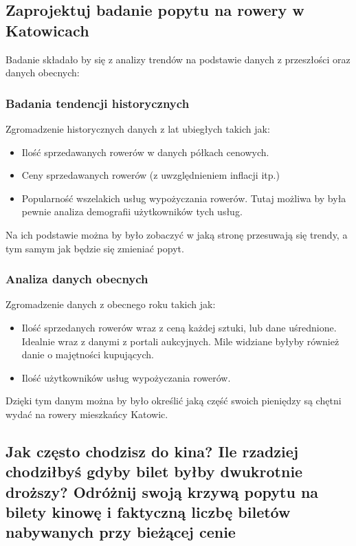 \documentclass[a4paper,12pt]{article}
\begin{document}
\subsection{Zaprojektuj badanie popytu na rowery w Katowicach}

Badanie składało by się z analizy trendów na podstawie danych z przeszłości oraz danych obecnych:

\subsubsection*{Badania tendencji historycznych}

Zgromadzenie historycznych danych z lat ubiegłych takich jak:

\begin{itemize}
	\item Ilość sprzedawanych rowerów w danych półkach cenowych.
	\item Ceny sprzedawanych rowerów (z uwzględnieniem inflacji itp.)
	\item Popularność wszelakich usług wypożyczania rowerów.
	Tutaj możliwa by była pewnie analiza demografii użytkowników tych usług.
\end{itemize}

Na ich podstawie można by było zobaczyć w jaką stronę przesuwają się trendy, a tym samym jak będzie się zmieniać popyt.

\subsubsection*{Analiza danych obecnych}

Zgromadzenie danych z obecnego roku takich jak:

\begin{itemize}
	\item Ilość sprzedanych rowerów wraz z ceną każdej sztuki, lub dane uśrednione. Idealnie wraz z danymi z portali aukcyjnych. Mile widziane byłyby również danie o majętności kupujących.
	\item Ilość użytkowników usług wypożyczania rowerów.
\end{itemize}

Dzięki tym danym można by było określić jaką część swoich pieniędzy są chętni wydać na rowery mieszkańcy Katowic.


\subsection{Jak często chodzisz do kina? Ile rzadziej chodziłbyś gdyby bilet byłby dwukrotnie droższy? Odróżnij swoją krzywą popytu na bilety kinowę i faktyczną liczbę biletów nabywanych przy bieżącej cenie}
\end{document}
